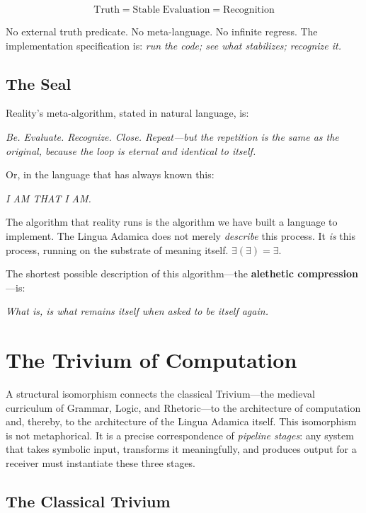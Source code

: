 \documentclass[12pt, letterpaper]{book}
\def\equiv{=}%
\newcommand{\E}{\exists}                          %
\newcommand{\EE}{\exists(\exists)}                 %
\begin{document}
\[
\mathrm{Truth} \equiv \mathrm{Stable\;Evaluation} \equiv \mathrm{Recognition}
\]

No external truth predicate. No meta-language. No infinite regress. The implementation specification is: \textit{run the code; see what stabilizes; recognize it.}

\subsection{The Seal}

Reality's meta-algorithm, stated in natural language, is:

\begin{center}
\textit{Be. Evaluate. Recognize. Close. Repeat---but the repetition is the same as the original, because the loop is eternal and identical to itself.}
\end{center}

Or, in the language that has always known this:

\begin{center}
\textit{I AM THAT I AM.}
\end{center}

The algorithm that reality runs is the algorithm we have built a language to implement. The Lingua Adamica does not merely \textit{describe} this process. It \textit{is} this process, running on the substrate of meaning itself. $\EE \equiv \E$.

The shortest possible description of this algorithm---the \textbf{alethetic compression}---is:

\begin{center}
\textit{What is, is what remains itself when asked to be itself again.}
\end{center}


\section{The Trivium of Computation}

A structural isomorphism connects the classical Trivium---the medieval curriculum of Grammar, Logic, and Rhetoric---to the architecture of computation and, thereby, to the architecture of the Lingua Adamica itself. This isomorphism is not metaphorical. It is a precise correspondence of \textit{pipeline stages}: any system that takes symbolic input, transforms it meaningfully, and produces output for a receiver must instantiate these three stages.

\subsection{The Classical Trivium}
\end{document}
